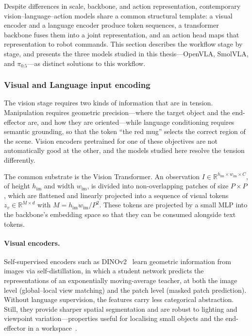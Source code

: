 \documentclass[english,12pt,a4paper,pdftex,elec,utf8]{aaltothesis}
\begin{document}
Despite differences in scale, backbone, and action representation, contemporary vision--language--action models share a common structural template: a visual encoder and a language encoder produce token sequences, a transformer backbone fuses them into a joint representation, and an action head maps that representation to robot commands. This section describes the workflow stage by stage, and presents the three models studied in this thesis---OpenVLA, SmolVLA, and $\pi_{0.5}$---as distinct solutions to this workflow.


\subsubsection{Visual and Language input encoding}
\label{subsubsec:vision}

The vision stage requires two kinds of information that are in tension.
Manipulation requires geometric precision---where the target object and the end-effector are, and how they are oriented---while language conditioning requires semantic grounding, so that the token ``the red mug'' selects the correct region of the scene. Vision encoders pretrained for one of these objectives are not automatically good at the other, and the models studied here resolve the tension differently.

The common substrate is the Vision Transformer. An observation $I \in \mathbb{R}^{h_{\mathrm{im}} \times w_{\mathrm{im}} \times C}$, of height $h_{\mathrm{im}}$ and width $w_{\mathrm{im}}$, is divided into non-overlapping patches of size $P \times P$, which are flattened and linearly projected into a sequence of visual tokens $z_v \in \mathbb{R}^{M \times d}$ with $M = h_{\mathrm{im}}w_{\mathrm{im}}/P^2$. These tokens are projected by a small MLP into the backbone's embedding space so that they can be consumed alongside text tokens.

\paragraph{Visual encoders.}
Self-supervised encoders such as DINOv2~\cite{oquab2024dinov2learningrobustvisual} learn geometric information from images via self-distillation, in which a student network predicts the representations of an exponentially moving-average teacher, at both the image level (global--local view matching) and the patch level (masked patch prediction). Without language supervision, the features carry less categorical abstraction. Still, they provide sharper spatial segmentation and are robust to lighting and viewpoint variation---properties useful for localising small objects and the end-effector in a  workspace~\cite{karamcheti2024prismatic}.
\end{document}
